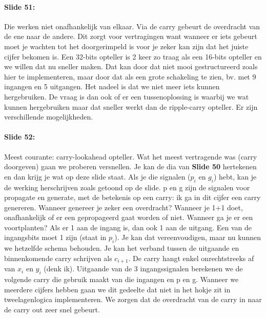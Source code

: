 \documentclass[10pt,a4paper]{book}
\begin{document}
\paragraph{Slide 51:} Die werken niet onafhankelijk van elkaar. Via de carry gebeurt de overdracht van de ene naar de andere. Dit zorgt voor vertragingen want wanneer er iets gebeurt moet je wachten tot het doorgerimpeld is voor je zeker kan zijn dat het juiste cijfer bekomen is. Een 32-bits opteller is 2 keer zo traag als een 16-bits opteller en we willen dat nu sneller maken. Dat kan door dat niet mooi gestructureerd zoals hier te implementeren, maar door dat als een grote schakeling te zien, bv. met 9 ingangen en 5 uitgangen. Het nadeel is dat we niet meer iets kunnen hergebruiken. De vraag is dan ook of er een tussenoplossing is waarbij we wat kunnen hergebruiken maar dat sneller werkt dan de ripple-carry opteller. Er zijn verschillende mogelijkheden.

\paragraph{Slide 52:} Meest courante: carry-lookahead opteller. Wat het meest vertragende was (carry doorgeven) gaan we proberen versnellen. Je kan de dia van \textbf{Slide 50} hertekenen en dan krijg je wat op deze slide staat. Als je die signalen ($p_i$ en $g_i$) hebt, kan je de werking herschrijven zoals getoond op de slide. p en g zijn de signalen voor propagate en generate, met de betekenis op een carry: ik ga in dit cijfer een carry genereren. Wanneer genereer je zeker een overdracht? Wanneer je 1+1 doet, onafhankelijk of er een gepropageerd gaat worden of niet. Wanneer ga je er een voortplanten? Als er 1 aan de ingang is, dan ook 1 aan de uitgang. Een van de ingangsbits moet 1 zijn (staat in $p_i$). Je kan dat vereenvoudigen, maar nu kunnen we hetzelfde schema behouden. Je kan het verband tussen de uitgaande en binnenkomende carry schrijven als $c_{i+1}$. De carry hangt enkel onrechtstreeks af van $x_i$ en $y_i$ (denk ik). Uitgaande van de 3 ingangssignalen berekenen we de volgende carry die gebruik maakt van die ingangen en p en g. Wanneer we meerdere cijfers hebben gaan we dit gedeelte dat niet in het hokje zit in tweelagenlogica implementeren. We zorgen dat de overdracht van de carry in naar de carry out zeer snel gebeurt.
\end{document}
